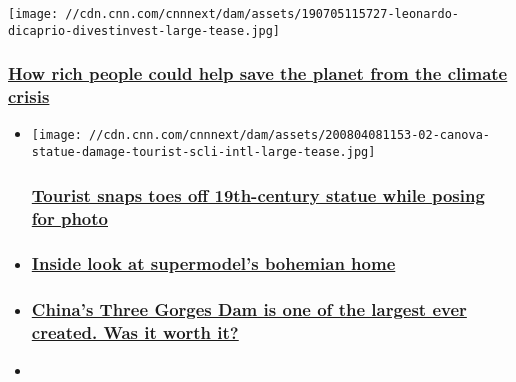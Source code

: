 \begin{itemize}
  \texttt{[image: //cdn.cnn.com/cnnnext/dam/assets/190705115727-leonardo-dicaprio-divestinvest-large-tease.jpg]}

  \hypertarget{how-rich-people-could-help-save-the-planet-from-the-climate-crisis}{%
  \subsubsection{\texorpdfstring{\href{/2019/07/12/health/rich-people-climate-change-intl/index.html}{How
  rich people could help save the planet from the climate
  crisis}}{How rich people could help save the planet from the climate crisis}}\label{how-rich-people-could-help-save-the-planet-from-the-climate-crisis}}
\end{itemize}

\begin{itemize}
\item
  \href{/style/article/canova-statue-damage-tourist-scli-intl/index.html}{}

  \texttt{[image: //cdn.cnn.com/cnnnext/dam/assets/200804081153-02-canova-statue-damage-tourist-scli-intl-large-tease.jpg]}

  \hypertarget{tourist-snaps-toes-off-19th-century-statue-while-posing-for-photo}{%
  \subsubsection{\texorpdfstring{\href{/style/article/canova-statue-damage-tourist-scli-intl/index.html}{Tourist
  snaps toes off 19th-century statue while posing for
  photo}}{Tourist snaps toes off 19th-century statue while posing for photo}}\label{tourist-snaps-toes-off-19th-century-statue-while-posing-for-photo}}
\item
  \hypertarget{inside-look-at-supermodels-bohemian-home}{%
  \subsubsection{\texorpdfstring{\href{/style/article/kendall-jenner-model-home/index.html}{Inside
  look at supermodel's bohemian
  home}}{Inside look at supermodel's bohemian home}}\label{inside-look-at-supermodels-bohemian-home}}
\item
  \hypertarget{chinas-three-gorges-dam-is-one-of-the-largest-ever-created-was-it-worth-it}{%
  \subsubsection{\texorpdfstring{\href{/style/article/china-three-gorges-dam-intl-hnk-dst/index.html}{China's
  Three Gorges Dam is one of the largest ever created. Was it worth
  it?}}{China's Three Gorges Dam is one of the largest ever created. Was it worth it?}}\label{chinas-three-gorges-dam-is-one-of-the-largest-ever-created-was-it-worth-it}}
\item
  \hypertarget{from-accra-to-london-how-photographer-james-barnor-captured-decades-of-style}{%
}
\end{itemize}
